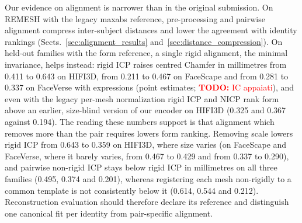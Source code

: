 \documentclass[10pt,twocolumn,letterpaper]{article}
\newcommand{\todo}[1]{\textcolor{red}{\textbf{TODO:} #1}}
\begin{document}
Our evidence on alignment is narrower than in the original submission. On REMESH with the legacy maxabs reference, pre-processing and pairwise alignment compress inter-subject distances and lower the agreement with identity rankings (Sects.~\ref{sec:alignment_results} and~\ref{sec:distance_compression}). On held-out families with the form reference, a single rigid alignment, the minimal invariance, helps instead: rigid ICP raises centred Chamfer in millimetres from 0.411 to 0.643 on HIFI3D, from 0.211 to 0.467 on FaceScape and from 0.281 to 0.337 on FaceVerse with expressions (point estimates; \todo{IC appaiati}), and even with the legacy per-mesh normalization rigid ICP and NICP rank form above an earlier, size-blind version of our encoder on HIFI3D (0.325 and 0.367 against 0.194). The reading these numbers support is that alignment which removes more than the pair requires lowers form ranking. Removing scale lowers rigid ICP from 0.643 to 0.359 on HIFI3D, where size varies (on FaceScape and FaceVerse, where it barely varies, from 0.467 to 0.429 and from 0.337 to 0.290), and pairwise non-rigid ICP stays below rigid ICP in millimetres on all three families (0.495, 0.374 and 0.201), whereas registering each mesh non-rigidly to a common template is not consistently below it (0.614, 0.544 and 0.212). Reconstruction evaluation should therefore declare its reference and distinguish one canonical fit per identity from pair-specific alignment.
\end{document}
